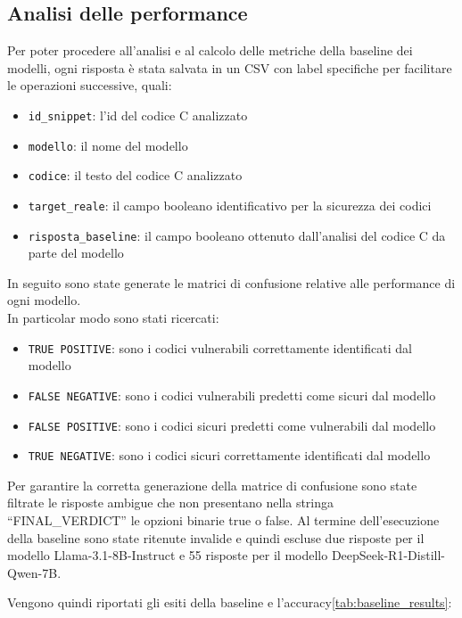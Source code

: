 \subsection{Analisi delle performance}
Per poter procedere all'analisi e al calcolo delle metriche della baseline dei modelli, ogni risposta è stata salvata in un CSV con label specifiche per facilitare le operazioni successive, quali:\\

\begin{itemize}[noitemsep]
\item \texttt{id\_snippet}: l'id del codice C analizzato
\item \texttt{modello}: il nome del modello
\item \texttt{codice}: il testo del codice C analizzato
\item \texttt{target\_reale}: il campo booleano identificativo per la sicurezza dei codici
\item \texttt{risposta\_baseline}: il campo booleano ottenuto dall'analisi del codice C da parte del modello
\end{itemize}

In seguito sono state generate le matrici di confusione relative alle performance di ogni modello.\\
In particolar modo sono stati ricercati:

\begin{itemize}[noitemsep]
\item \texttt{TRUE POSITIVE}: sono i codici vulnerabili correttamente identificati dal modello
\item \texttt{FALSE NEGATIVE}: sono i codici vulnerabili predetti come sicuri dal modello
\item \texttt{FALSE POSITIVE}: sono i codici sicuri predetti come vulnerabili dal modello
\item \texttt{TRUE NEGATIVE}: sono i codici sicuri correttamente identificati dal modello
\end{itemize}

Per garantire la corretta generazione della matrice di confusione sono state filtrate le risposte ambigue che non presentano nella stringa “FINAL\_VERDICT” le opzioni binarie true o false.
Al termine dell'esecuzione della baseline sono state ritenute invalide e quindi escluse due risposte per il modello Llama-3.1-8B-Instruct e 55 risposte per il modello DeepSeek-R1-Distill-Qwen-7B.

Vengono quindi riportati gli esiti della baseline e l'accuracy\ref{tab:baseline_results}:

